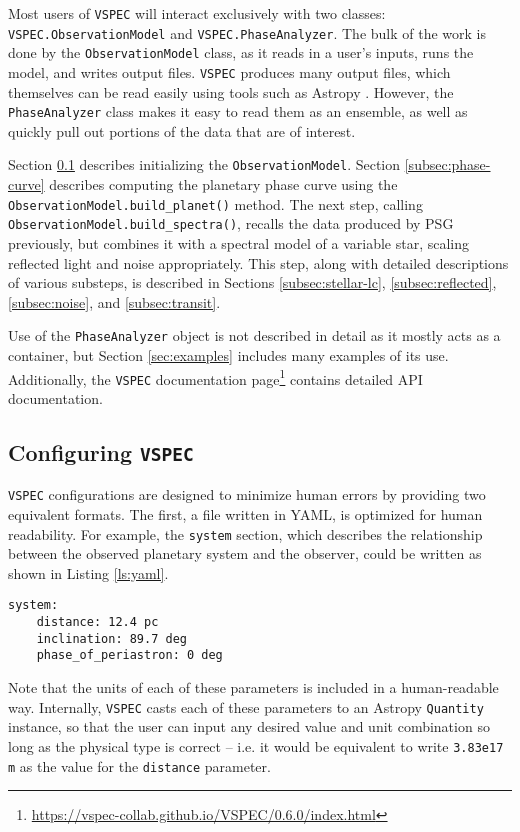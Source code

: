 \documentclass[linenumbers,5p,twocolumn,authoryear]{elsarticle}
\newcommand{\vspec}[1]{\texttt{VSPEC}#1}
\newcommand{\urldocsvspec}{\url{https://vspec-collab.github.io/VSPEC/0.6.0/index.html}}
\begin{document}
Most users of \vspec{} will interact exclusively with two classes: \texttt{VSPEC.ObservationModel} and \texttt{VSPEC.PhaseAnalyzer}. The bulk of the work is done by the \texttt{ObservationModel} class, as it reads in a user's inputs, runs the model, and writes output files. \vspec{} produces many output files, which themselves can be read easily using tools such as Astropy \citep{astropycollaboration2013,astropycollaboration2018,astropycollaboration2022}. However, the \texttt{PhaseAnalyzer} class makes it easy to read them as an ensemble, as well as quickly pull out portions of the data that are of interest.

Section \ref{subsec:config} describes initializing the \texttt{ObservationModel}. Section \ref{subsec:phase-curve} describes computing the planetary phase curve using the \texttt{ObservationModel.build\_planet()} method. The next step, calling \texttt{ObservationModel.build\_spectra()}, recalls the data produced by PSG previously, but combines it with a spectral model of a variable star, scaling reflected light and noise appropriately. This step, along with detailed descriptions of various substeps, is described in Sections \ref{subsec:stellar-lc}, \ref{subsec:reflected}, \ref{subsec:noise}, and \ref{subsec:transit}.

Use of the \texttt{PhaseAnalyzer} object is not described in detail as it mostly acts as a container, but Section \ref{sec:examples} includes many examples of its use. Additionally, the \vspec{} documentation page\footnote{\urldocsvspec} contains detailed API documentation.
\subsection{Configuring \vspec{}}
\label{subsec:config}

\vspec{} configurations are designed to minimize human errors by providing two equivalent formats. The first, a file written in YAML, is optimized for
human readability. For example, the \texttt{system} section, which describes the relationship between the observed planetary system and the observer, could
be written as shown in Listing \ref{ls:yaml}.
\begin{lstlisting}[label={ls:yaml},caption=\vspec{} YAML Configuration]
system:
    distance: 12.4 pc
    inclination: 89.7 deg
    phase_of_periastron: 0 deg
\end{lstlisting}
Note that the units of each of these parameters is included in a human-readable way. Internally, \vspec{} casts each of these parameters to an Astropy
\texttt{Quantity} instance, so that the user can input any desired value and unit combination so long as the physical type is correct -- i.e. it would be
equivalent to write \texttt{3.83e17 m} as the value for the \texttt{distance} parameter.
\end{document}
